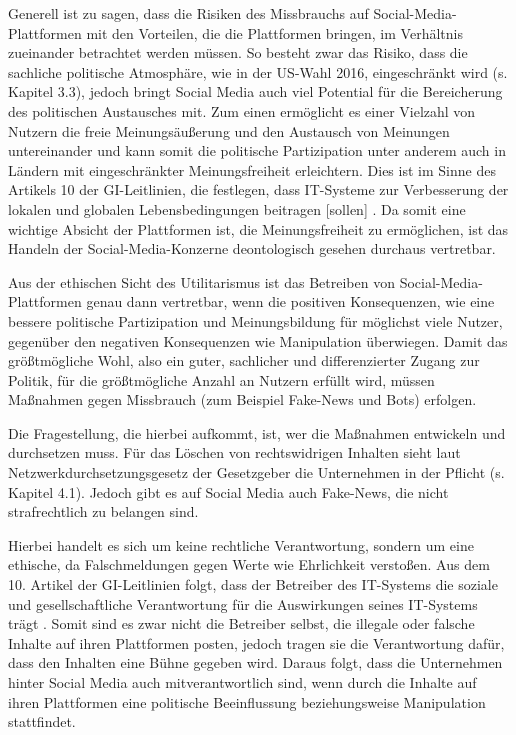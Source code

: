 Generell ist zu sagen, dass die Risiken des Missbrauchs auf Social-Media-Plattformen mit den Vorteilen, die die Plattformen bringen, im Verhältnis zueinander betrachtet werden müssen. So besteht zwar das Risiko, dass die sachliche politische Atmosphäre, wie in der US-Wahl 2016, eingeschränkt wird (s. Kapitel 3.3), jedoch bringt Social Media auch viel Potential für die Bereicherung des politischen Austausches mit. Zum einen ermöglicht es einer Vielzahl von Nutzern die freie Meinungsäußerung und den Austausch von Meinungen untereinander und kann somit die politische Partizipation unter anderem auch in Ländern mit eingeschränkter Meinungsfreiheit erleichtern. Dies ist im Sinne des Artikels 10 der GI-Leitlinien, die festlegen, dass \glqq IT-Systeme zur Verbesserung der lokalen und globalen Lebensbedingungen beitragen [sollen]\grqq{} \autocite[vgl.][Art. 10]{LeitlinienGI}. 
Da somit eine wichtige Absicht der Plattformen ist, die Meinungsfreiheit zu ermöglichen, ist das Handeln der Social-Media-Konzerne deontologisch gesehen durchaus vertretbar. 

Aus der ethischen Sicht des Utilitarismus ist das Betreiben von Social-Media-Plattformen genau dann vertretbar, wenn die positiven Konsequenzen, wie eine bessere politische Partizipation und Meinungsbildung für möglichst viele Nutzer, gegenüber den negativen Konsequenzen wie Manipulation überwiegen. Damit das \glqq größtmögliche Wohl\grqq{}, also ein guter, sachlicher und differenzierter Zugang zur Politik, für die größtmögliche Anzahl an Nutzern erfüllt wird, müssen Maßnahmen gegen Missbrauch (zum Beispiel Fake-News und Bots) erfolgen.

Die Fragestellung, die hierbei aufkommt, ist, wer die Maßnahmen entwickeln und durchsetzen muss. Für das Löschen von rechtswidrigen Inhalten sieht laut Netzwerkdurchsetzungsgesetz der Gesetzgeber die Unternehmen  in der Pflicht (s. Kapitel 4.1). Jedoch gibt es auf Social Media auch Fake-News, die nicht strafrechtlich zu belangen sind.

Hierbei handelt es sich um keine rechtliche Verantwortung, sondern um eine ethische, da Falschmeldungen gegen Werte wie Ehrlichkeit verstoßen. Aus dem 10. Artikel der GI-Leitlinien folgt, dass der Betreiber des IT-Systems \glqq die soziale und gesellschaftliche Verantwortung für die Auswirkungen\grqq{} seines IT-Systems trägt \autocite[vgl.][Art. 10]{LeitlinienGI}. Somit sind es zwar nicht die Betreiber selbst, die illegale oder falsche Inhalte auf ihren Plattformen posten, jedoch tragen sie die Verantwortung dafür, dass den Inhalten eine Bühne gegeben wird. Daraus folgt, dass die Unternehmen hinter Social Media auch mitverantwortlich sind, wenn durch die Inhalte auf ihren Plattformen eine politische Beeinflussung beziehungsweise Manipulation stattfindet. 

